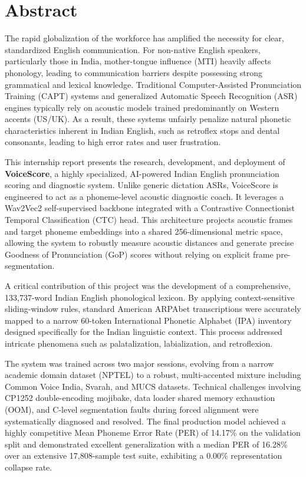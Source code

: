 \chapter*{Abstract}

The rapid globalization of the workforce has amplified the necessity for clear, standardized English communication. For non-native English speakers, particularly those in India, mother-tongue influence (MTI) heavily affects phonology, leading to communication barriers despite possessing strong grammatical and lexical knowledge. Traditional Computer-Assisted Pronunciation Training (CAPT) systems and generalized Automatic Speech Recognition (ASR) engines typically rely on acoustic models trained predominantly on Western accents (US/UK). As a result, these systems unfairly penalize natural phonetic characteristics inherent in Indian English, such as retroflex stops and dental consonants, leading to high error rates and user frustration.

This internship report presents the research, development, and deployment of \textbf{VoiceScore}, a highly specialized, AI-powered Indian English pronunciation scoring and diagnostic system. Unlike generic dictation ASRs, VoiceScore is engineered to act as a phoneme-level acoustic diagnostic coach. It leverages a Wav2Vec2 self-supervised backbone integrated with a Contrastive Connectionist Temporal Classification (CTC) head. This architecture projects acoustic frames and target phoneme embeddings into a shared 256-dimensional metric space, allowing the system to robustly measure acoustic distances and generate precise Goodness of Pronunciation (GoP) scores without relying on explicit frame pre-segmentation.

A critical contribution of this project was the development of a comprehensive, 133,737-word Indian English phonological lexicon. By applying context-sensitive sliding-window rules, standard American ARPAbet transcriptions were accurately mapped to a narrow 60-token International Phonetic Alphabet (IPA) inventory designed specifically for the Indian linguistic context. This process addressed intricate phenomena such as palatalization, labialization, and retroflexion.

The system was trained across two major sessions, evolving from a narrow academic domain dataset (NPTEL) to a robust, multi-accented mixture including Common Voice India, Svarah, and MUCS datasets. Technical challenges involving CP1252 double-encoding mojibake, data loader shared memory exhaustion (OOM), and C-level segmentation faults during forced alignment were systematically diagnosed and resolved. The final production model achieved a highly competitive Mean Phoneme Error Rate (PER) of 14.17\% on the validation split and demonstrated excellent generalization with a median PER of 16.28\% over an extensive 17,808-sample test suite, exhibiting a 0.00\% representation collapse rate.

